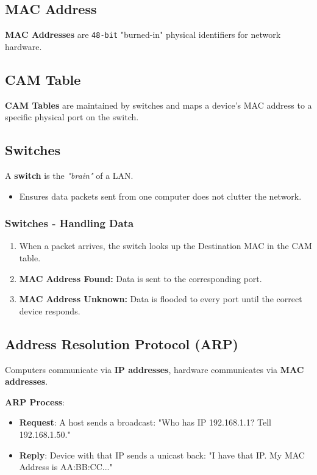 \documentclass[12pt, letterpaper]{article}
\begin{document}
\subsection*{MAC Address}

\textbf{MAC Addresses} are \texttt{48-bit} "burned-in" physical identifiers for network hardware.

\subsection*{CAM Table}

\textbf{CAM Tables} are maintained by switches and maps a device's MAC address to a specific physical port on the switch.

\subsection*{Switches}

A \textbf{switch} is the \textit{"brain"} of a LAN.
\begin{itemize}
    \item Ensures data packets sent from one computer does not clutter the network.
\end{itemize}

\subsubsection*{Switches - Handling Data}

\begin{enumerate}
    \item When a packet arrives, the switch looks up the Destination MAC in the CAM table.
    \item \textbf{MAC Address Found:} Data is sent to the corresponding port.
    \item \textbf{MAC Address Unknown:} Data is flooded to every port until the correct device responds.
\end{enumerate}

\subsection*{Address Resolution Protocol (ARP)}

Computers communicate via \textbf{IP addresses}, hardware communicates via \textbf{MAC addresses}.
\medskip

\textbf{ARP Process}:
\begin{itemize}
    \item \textbf{Request}: A host sends a broadcast: "Who has IP 192.168.1.1? Tell 192.168.1.50."
    \item \textbf{Reply}: Device with that IP sends a unicast back: "I have that IP. My MAC Address is AA:BB:CC..."
\end{itemize}
\end{document}
